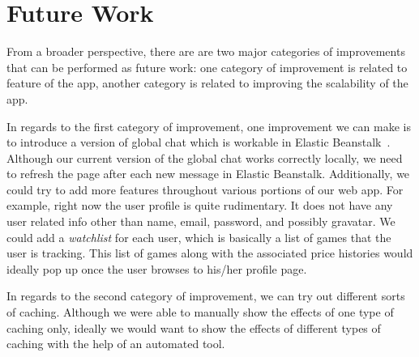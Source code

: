 \chapter{Future Work}
From a broader perspective, there are are two major categories of improvements that can be performed as future work: one category of improvement is related to feature of the app, another category is related to improving the scalability of the app.

In regards to the first category of improvement, one improvement we can make is to introduce a version of global chat which is workable in Elastic Beanstalk~\cite{eb}. Although our current version of the global chat works correctly locally, we need to refresh the page after each new message in Elastic Beanstalk. Additionally, we could try to add more features throughout various portions of our web app. For example, right now the user profile is quite rudimentary. It does not have any user related info other than name, email, password, and possibly gravatar. We could add a \textit{watchlist} for each user, which is basically a list of games that the user is tracking. This list of games along with the associated price histories would ideally pop up once the user browses to his/her profile page.

In regards to the second category of improvement, we can try out different sorts of caching. Although we were able to manually show the effects of one type of caching only, ideally we would want to show the effects of different types of caching with the help of an automated tool.
